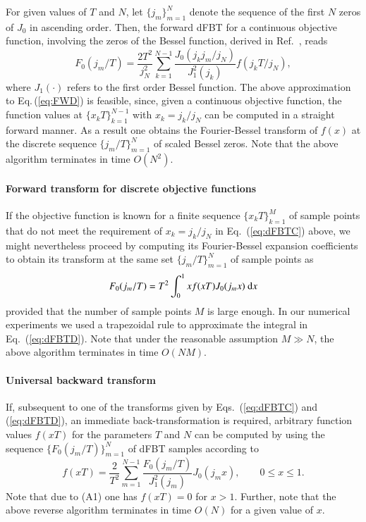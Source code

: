 \documentclass[review]{elsarticle}
\begin{document}
For given values of $T$ and $N$, let $\{j_m\}_{m=1}^N$ denote the sequence of the
first $N$ zeros of $J_0$ in ascending order. Then, the forward dFBT for a
continuous objective function, involving the zeros of the Bessel function, 
derived in Ref.~\cite{FiskJohnson:1987}, reads
\begin{equation}
F_0(j_m/T) = \frac{2 T^2}{j_N^2} \sum_{k=1}^{N-1} \frac{J_0(j_k j_m/ j_N)}{J_1^2(j_k)} f(j_k T/j_N), \label{eq:dFBTC}
\end{equation}
where $J_1(\cdot)$ refers to the first order Bessel function.  The above
approximation to Eq.\,(\ref{eq:FWD}) is feasible, since, given a continuous
objective function, the function values at $\{x_k T\}_{k=1}^{N-1}$ with
$x_k=j_k/j_N$ can be computed in a straight forward manner. As a result one
obtains the Fourier-Bessel transform of $f(x)$ at the discrete sequence
$\{j_m/T\}_{m=1}^N$ of scaled Bessel zeros.  Note that the above algorithm
terminates in time $O(N^2)$.

\paragraph{Forward transform for discrete objective functions}

If the objective function is known for a finite sequence $\{x_k T\}_{k=1}^M$ of
sample points that do not meet the requirement of $x_k=j_k/j_N$ in
Eq.~(\ref{eq:dFBTC}) above, we might nevertheless proceed by computing its
Fourier-Bessel expansion coefficients to obtain its transform at the same set
$\{j_m/T\}_{m=1}^N$ of sample points as
\begin{equation}
F_0(j_m/T) = T^2 \int_0^1 x f(x T) J_0(j_m x)~{\rm{d}}x \label{eq:dFBTD}
\end{equation}
provided that the number of sample points $M$ is large enough. In our numerical
experiments we used a trapezoidal rule to approximate the integral in
Eq.~(\ref{eq:dFBTD}).
Note that under the reasonable assumption $M\gg N$, the above algorithm 
terminates in time $O(NM)$.

\paragraph{Universal backward transform}

If, subsequent to one of the transforms given by Eqs.~(\ref{eq:dFBTC}) and 
(\ref{eq:dFBTD}), an immediate back-transformation is required, arbitrary 
function values $f(x T)$ for the parameters $T$ and $N$ can be computed by 
using the sequence $\{F_0(j_m/T)\}_{m=1}^N$ of dFBT samples
according to \cite{FiskJohnson:1987}
\begin{equation}
f(x T) = \frac{2}{T^2} \sum_{m=1}^{N-1} \frac{F_0(j_m/T)}{J_1^2(j_m)} J_0(j_m x), \qquad{0\leq x \leq 1}. \label{eq:dFBTRev}
\end{equation}
Note that due to (A1) one has $f(x T) = 0$ for $x>1$.
Further, note that the above reverse algorithm terminates in time $O(N)$ for
a given value of $x$.
\end{document}
